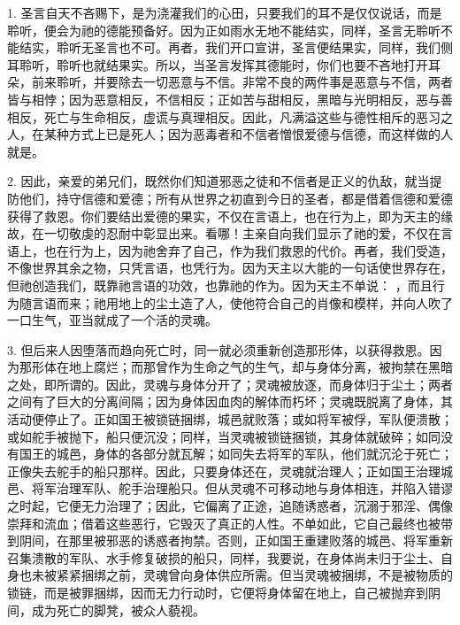 1. 圣言自天不吝赐下，是为浇灌我们的心田，只要我们的耳不是仅仅说话，而是聆听，便会为祂的德能预备好。因为正如雨水无地不能结实，同样，圣言无聆听不能结实，聆听无圣言也不可。再者，我们开口宣讲，圣言便结果实，同样，我们侧耳聆听，聆听也就结果实。所以，当圣言发挥其德能时，你们也要不吝地打开耳朵，前来聆听，并要除去一切恶意与不信。非常不良的两件事是恶意与不信，两者皆与相悖；因为恶意相反，不信相反；正如苦与甜相反，黑暗与光明相反，恶与善相反，死亡与生命相反，虚谎与真理相反。因此，凡满溢这些与德性相斥的恶习之人，在某种方式上已是死人；因为恶毒者和不信者憎恨爱德与信德，而这样做的人就是。\par

2. 因此，亲爱的弟兄们，既然你们知道邪恶之徒和不信者是正义的仇敌，就当提防他们，持守信德和爱德；所有从世界之初直到今日的圣者，都是借着信德和爱德获得了救恩。你们要结出爱德的果实，不仅在言语上，也在行为上，即为天主的缘故，在一切敬虔的忍耐中彰显出来。看哪！主亲自向我们显示了祂的爱，不仅在言语上，也在行为上，因为祂舍弃了自己，作为我们救恩的代价。再者，我们受造，不像世界其余之物，只凭言语，也凭行为。因为天主以大能的一句话使世界存在，但祂创造我们，既靠祂言语的功效，也靠祂的作为。因为天主不单说： ，而且行为随言语而来；祂用地上的尘土造了人，使他符合自己的肖像和模样，并向人吹了一口生气，亚当就成了一个活的灵魂。\par

3. 但后来人因堕落而趋向死亡时，同一就必须重新创造那形体，以获得救恩。因为那形体在地上腐烂；而那曾作为生命之气的生气，却与身体分离，被拘禁在黑暗之处，即所谓的。因此，灵魂与身体分开了；灵魂被放逐，而身体归于尘土；两者之间有了巨大的分离间隔；因为身体因血肉的解体而朽坏；灵魂既脱离了身体，其活动便停止了。正如国王被锁链捆绑，城邑就败落；或如将军被俘，军队便溃散；或如舵手被抛下，船只便沉没；同样，当灵魂被锁链捆锁，其身体就破碎；如同没有国王的城邑，身体的各部分就瓦解；如同失去将军的军队，他们就沉沦于死亡；正像失去舵手的船只那样。因此，只要身体还在，灵魂就治理人；正如国王治理城邑、将军治理军队、舵手治理船只。但从灵魂不可移动地与身体相连，并陷入错谬之时起，它便无力治理了；因此，它偏离了正途，追随诱惑者，沉溺于邪淫、偶像崇拜和流血；借着这些恶行，它毁灭了真正的人性。不单如此，它自己最终也被带到阴间，在那里被邪恶的诱惑者拘禁。否则，正如国王重建败落的城邑、将军重新召集溃散的军队、水手修复破损的船只，同样，我要说，在身体尚未归于尘土、自身也未被紧紧捆绑之前，灵魂曾向身体供应所需。但当灵魂被捆绑，不是被物质的锁链，而是被罪捆绑，因而无力行动时，它便将身体留在地上，自己被抛弃到阴间，成为死亡的脚凳，被众人藐视。\par

